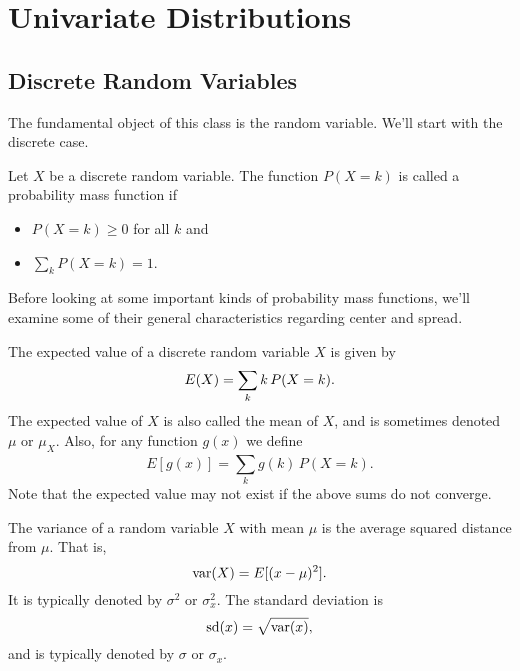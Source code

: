 \documentclass[../m157main.tex]{subfiles}
\begin{document}
\chapter{Univariate Distributions}
\section{Discrete Random Variables}
The fundamental object of this class is the random variable.
We'll start with the discrete case.

\begin{definition}
    Let $X$ be a discrete random variable.
    The function $P(X = k)$ is called a probability mass function if
    \begin{itemize}
        \item $P(X = k) \geq 0$ for all $k$ and
        \item $\sum_k P(X = k) = 1$.
    \end{itemize}
\end{definition}

Before looking at some important kinds of probability mass functions, we'll examine some of their general characteristics regarding center and spread.

\begin{definition}
    The expected value of a discrete random variable $X$ is given by \vspace{-4pt}
    \[ E(X) = \sum_k k \,P(X = k). \vspace{-4pt}     \]
    The expected value of $X$ is also called the mean of $X$, and is sometimes denoted $\mu$ or $\mu_X$.
    Also, for any function $g(x)$ we define \vspace{-8pt}
    \[ E[g(x)] = \sum_{k}^{} g(k) \,P(X = k). \]
    Note that the expected value may not exist if the above sums do not converge.
\end{definition}

\begin{definition}
    The variance of a random variable $X$ with mean $\mu$ is the average squared distance from $\mu$.
    That is, \vspace{-4pt}
    \[ \operatorname{var}(X) = E[(x-\mu)^2]. \] \vspace{-4pt}
    It is typically denoted by $\sigma^2$ or $\sigma_x^2$.
    The standard deviation is
    \[ \on{sd}(x) = \sqrt{\var(x)}, \vspace{-8pt} \]
    and is typically denoted by $\sigma$ or $\sigma_x$.
\end{definition}
\end{document}
